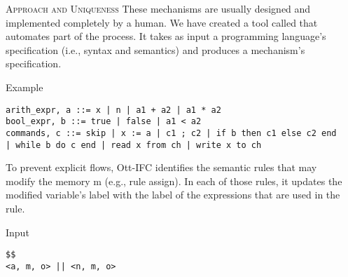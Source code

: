 \documentclass[final]{beamer}
\newlength{\onecolwid}
\newlength{\twocolwid}
\begin{document}
\begin{frame}[fragile]
\begin{columns}[t]
\begin{column}{\onecolwid}
\end{column}
\begin{column}{\twocolwid}

\begin{block}{\textsc{Approach and Uniqueness}}
These mechanisms are usually designed and implemented completely by a human. We have created a tool called \emph{\ottifc} that automates part of the process. It takes as input a programming language's specification (i.e., syntax and semantics) and produces a mechanism's specification. 

\begin{alertblock}{Example}
\begin{lstlisting}
arith_expr, a ::= x | n | a1 + a2 | a1 * a2                                    bool_expr, b ::= true | false | a1 < a2
commands, c ::= skip | x := a | c1 ; c2 | if b then c1 else c2 end | while b do c end | read x from ch | write x to ch  
\end{lstlisting}
\end{alertblock}      
\end{block}
\vspace{-1.6cm}
\color{black}
To prevent explicit flows, Ott-IFC identifies the semantic rules that may modify the memory m (e.g., rule assign). In each of those rules, it updates the modified variable's label with the label of the expressions that are used in the rule.\\
\vspace{-1cm}
\noindent
\begin{minipage}[t]{0.49\linewidth}
\begin{alertblock}{Input}
\begin{lstlisting}
$$
<a, m, o> || <n, m, o>

\end{lstlisting}
\end{alertblock}
\end{minipage}
\end{column}
\end{columns}
\end{frame}
\end{document}
